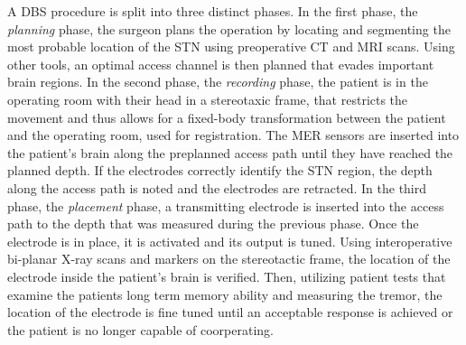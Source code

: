 A DBS procedure is split into three distinct phases. In the first phase, the \emph{planning} phase, the surgeon plans the operation by locating and segmenting the most probable location of the STN using preoperative CT and MRI scans. Using other tools, an optimal access channel is then planned that evades important brain regions. In the second phase, the \emph{recording} phase, the patient is in the operating room with their head in a stereotaxic frame, that restricts the movement and thus allows for a fixed-body transformation between the patient and the operating room, used for registration. The MER sensors are inserted into the patient's brain along the preplanned access path until they have reached the planned depth. If the electrodes correctly identify the STN region, the depth along the access path is noted and the electrodes are retracted. In the third phase, the \emph{placement} phase, a transmitting electrode is inserted into the access path to the depth that was measured during the previous phase. Once the electrode is in place, it is activated and its output is tuned. Using interoperative bi-planar X-ray scans and markers on the stereotactic frame, the location of the electrode inside the patient's brain is verified. Then, utilizing patient tests that examine the patients long term memory ability and measuring the tremor, the location of the electrode is fine tuned until an acceptable response is achieved or the patient is no longer capable of coorperating.

